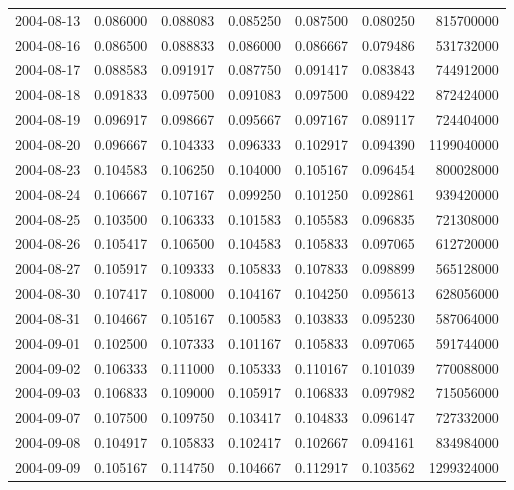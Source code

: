 \begin{tabular}{lrrrrrr}
2004-08-13 &    0.086000 &    0.088083 &    0.085250 &    0.087500 &    0.080250 &   815700000 \\
2004-08-16 &    0.086500 &    0.088833 &    0.086000 &    0.086667 &    0.079486 &   531732000 \\
2004-08-17 &    0.088583 &    0.091917 &    0.087750 &    0.091417 &    0.083843 &   744912000 \\
2004-08-18 &    0.091833 &    0.097500 &    0.091083 &    0.097500 &    0.089422 &   872424000 \\
2004-08-19 &    0.096917 &    0.098667 &    0.095667 &    0.097167 &    0.089117 &   724404000 \\
2004-08-20 &    0.096667 &    0.104333 &    0.096333 &    0.102917 &    0.094390 &  1199040000 \\
2004-08-23 &    0.104583 &    0.106250 &    0.104000 &    0.105167 &    0.096454 &   800028000 \\
2004-08-24 &    0.106667 &    0.107167 &    0.099250 &    0.101250 &    0.092861 &   939420000 \\
2004-08-25 &    0.103500 &    0.106333 &    0.101583 &    0.105583 &    0.096835 &   721308000 \\
2004-08-26 &    0.105417 &    0.106500 &    0.104583 &    0.105833 &    0.097065 &   612720000 \\
2004-08-27 &    0.105917 &    0.109333 &    0.105833 &    0.107833 &    0.098899 &   565128000 \\
2004-08-30 &    0.107417 &    0.108000 &    0.104167 &    0.104250 &    0.095613 &   628056000 \\
2004-08-31 &    0.104667 &    0.105167 &    0.100583 &    0.103833 &    0.095230 &   587064000 \\
2004-09-01 &    0.102500 &    0.107333 &    0.101167 &    0.105833 &    0.097065 &   591744000 \\
2004-09-02 &    0.106333 &    0.111000 &    0.105333 &    0.110167 &    0.101039 &   770088000 \\
2004-09-03 &    0.106833 &    0.109000 &    0.105917 &    0.106833 &    0.097982 &   715056000 \\
2004-09-07 &    0.107500 &    0.109750 &    0.103417 &    0.104833 &    0.096147 &   727332000 \\
2004-09-08 &    0.104917 &    0.105833 &    0.102417 &    0.102667 &    0.094161 &   834984000 \\
2004-09-09 &    0.105167 &    0.114750 &    0.104667 &    0.112917 &    0.103562 &  1299324000 \\

\end{tabular}
